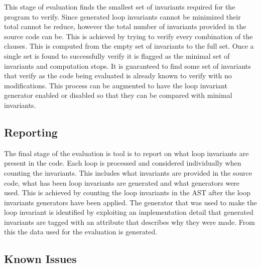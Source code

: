 This stage of evaluation finds the smallest set of invariants
required for the program to verify.
Since generated loop invariants cannot be minimized their total cannot be
reduce, however the total number of invariants provided in the source code can
be.
This is achieved by trying to verify every combination of the  clauses.
This is computed from the empty set of invariants to the full set.
Once a single set is found to successfully verify it is flagged as the minimal
set of invariants and computation stops.
It is guaranteed to find some set of invariants that verify as the code being
evaluated is already known to verify with no modifications.
This process can be augmented to have the loop invariant generator enabled or
disabled so that they can be compared with minimal invariants.

\subsection{Reporting}

The final stage of the evaluation is tool is to report on what loop invariants
are present in the code.
Each loop is processed and considered individually when counting the
invariants.
This includes what invariants are provided in the source code, what has been
loop invariants are generated and what generators were used.
This is achieved by counting the loop invariants in the AST after the loop
invariants generators have been applied.
The generator that was used to make the loop invariant is identified by
exploiting an implementation detail that generated invariants are tagged
with an attribute that describes why they were made.
From this the data used for the evaluation is generated.

\subsection{Known Issues}

